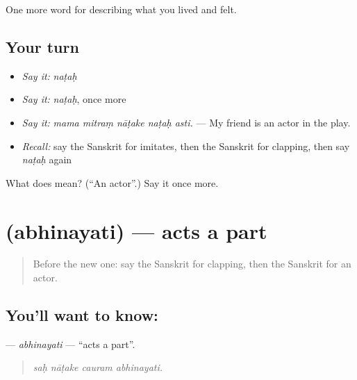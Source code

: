 \begin{grammarlens}[title={What you've built}]
One more word for describing what you lived and felt.
\end{grammarlens}

\subsection*{Your turn}
\begin{itemize}
\raggedright
  \item \emph{Say it:} \emph{naṭaḥ}
  \item \emph{Say it:} \emph{naṭaḥ}, once more
  \item \emph{Say it:} \emph{mama mitraṃ nāṭake naṭaḥ asti.} — My friend is an actor in the play.
  \item \emph{Recall:} say the Sanskrit for imitates, then the Sanskrit for clapping, then say \emph{naṭaḥ} again
\end{itemize}

\begin{tcolorbox}[breakable,colback=teal!4,colframe=teal!35!black,title={Before you move on}]
What does  mean? (\textquotedblleft{}An actor\textquotedblright{}.) Say it once more.
\end{tcolorbox}
\section[\texorpdfstring{\sk{अभिनयति} (abhinayati)}{अभिनयति (abhinayati)}]{ (abhinayati) — acts a part}

\label{lesson:SA-C523-abhinayati}



\begin{quote}
Before the new one: say the Sanskrit for clapping, then the Sanskrit for an actor.
\end{quote}

\subsection*{You'll want to know: }
\textbf{} — \emph{abhinayati} — \textquotedblleft{}acts a part\textquotedblright{}.

\begin{quote}
   
\end{quote}

\begin{quote}
\emph{saḥ nāṭake cauram abhinayati.}
\end{quote}

